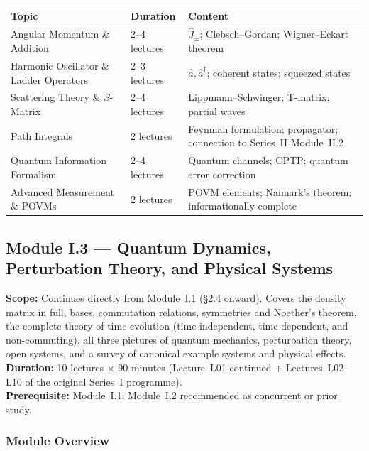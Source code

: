 \documentclass[11pt,a4paper]{article}
\newcommand{\coursebadge}[1]{%
  \begin{tcolorbox}[highlightbox]#1\end{tcolorbox}%
}
\begin{document}
{\footnotesize
\begin{center}
\begin{tabular}{@{}p{4.5cm}p{2.8cm}p{5.8cm}@{}}
\toprule
\textbf{Topic} & \textbf{Duration} & \textbf{Content}\\
\midrule
Angular Momentum \& Addition & 2--4 lectures & $\hat{J}_\pm$; Clebsch--Gordan; Wigner--Eckart theorem\\
Harmonic Oscillator \& Ladder Operators & 2--3 lectures & $\hat{a},\hat{a}^\dagger$; coherent states; squeezed states\\
Scattering Theory \& $S$-Matrix & 2--4 lectures & Lippmann--Schwinger; T-matrix; partial waves\\
Path Integrals & 2 lectures & Feynman formulation; propagator; connection to Series~II Module~II.2\\
Quantum Information Formalism & 2--4 lectures & Quantum channels; CPTP; quantum error correction\\
Advanced Measurement \& POVMs & 2 lectures & POVM elements; Naimark's theorem; informationally complete\\
\bottomrule
\end{tabular}
\end{center}
}%

\newpage
\subsection{Module I.3 --- Quantum Dynamics, Perturbation Theory, and Physical Systems}
\label{sec:mod-I3}

\coursebadge{%
  \textbf{Scope:} Continues directly from Module~I.1 (\S2.4 onward). Covers the
  density matrix in full, bases, commutation relations, symmetries and Noether's
  theorem, the complete theory of time evolution (time-independent, time-dependent,
  and non-commuting), all three pictures of quantum mechanics, perturbation theory,
  open systems, and a survey of canonical example systems and physical effects.\\[2pt]
  \textbf{Duration:} 10 lectures $\times$ 90 minutes (Lecture~L01 continued + Lectures~L02--L10
  of the original Series~I programme).\\[2pt]
  \textbf{Prerequisite:} Module~I.1; Module~I.2 recommended as concurrent or prior study.
}

\subsubsection*{Module Overview}
\end{document}
